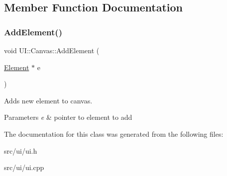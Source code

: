 \subsection{Member Function Documentation}
\mbox{\label{classUI_1_1Canvas_ad81e6b6a2c382a65c730ad16fc90a02b}} 
\subsubsection{\texorpdfstring{Add\+Element()}{AddElement()}}
{\footnotesize\ttfamily void U\+I\+::\+Canvas\+::\+Add\+Element (\begin{DoxyParamCaption}\item[{\hyperlink{classUI_1_1Element}{Element} $\ast$}]{e }\end{DoxyParamCaption})}



Adds new element to canvas. 


\begin{DoxyParams}{Parameters}
{\em e} & pointer to element to add \\
\hline
\end{DoxyParams}


The documentation for this class was generated from the following files\+:\begin{DoxyCompactItemize}
\item 
src/ui/ui.\+h\item 
src/ui/ui.\+cpp\end{DoxyCompactItemize}
